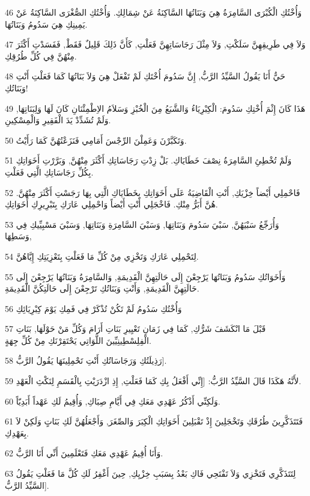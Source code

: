 \par 46 وَأُخْتُكِ الْكُبْرَى السَّامِرَةُ هِيَ وَبَنَاتُهَا السَّاكِنَةُ عَنْ شِمَالِكِ. وَأُخْتُكِ الصُّغْرَى السَّاكِنَةُ عَنْ يَمِينِكِ هِيَ سَدُومُ وَبَنَاتُهَا.
\par 47 وَلاَ فِي طَرِيقِهِنَّ سَلَكْتِ, وَلاَ مِثْلَ رَجَاسَاتِهِنَّ فَعَلْتِ, كَأَنَّ ذَلِكَ قَلِيلٌ فَقَطْ, فَفَسَدْتِ أَكْثَرَ مِنْهُنَّ فِي كُلِّ طُرُقِكِ.
\par 48 حَيٌّ أَنَا يَقُولُ السَّيِّدُ الرَّبُّ, إِنَّ سَدُومَ أُخْتَكِ لَمْ تَفْعَلْ هِيَ وَلاَ بَنَاتُهَا كَمَا فَعَلْتِ أَنْتِ وَبَنَاتُكِ!
\par 49 هَذَا كَانَ إِثْمَ أُخْتِكِ سَدُومَ: الْكِبْرِيَاءُ وَالشَّبَعُ مِنَ الْخُبْزِ وَسَلاَمُ الاِطْمِئْنَانِ كَانَ لَهَا وَلِبَنَاتِهَا, وَلَمْ تُشَدِّدْ يَدَ الْفَقِيرِ وَالْمِسْكِينِ.
\par 50 وَتَكَبَّرْنَ وَعَمِلْنَ الرِّجْسَ أَمَامِي فَنَزَعْتُهُنَّ كَمَا رَأَيْتُ.
\par 51 وَلَمْ تُخْطِئِ السَّامِرَةُ نِصْفَ خَطَايَاكِ. بَلْ زِدْتِ رَجَاسَاتِكِ أَكْثَرَ مِنْهُنَّ, وَبَرَّرْتِ أَخَوَاتِكِ بِكُلِّ رَجَاسَاتِكِ الَّتِي فَعَلْتِ.
\par 52 فَاحْمِلِي أَيْضاً خِزْيَكِ, أَنْتِ الْقَاضِيَةُ عَلَى أَخَوَاتِكِ بِخَطَايَاكِ الَّتِي بِهَا رَجَسْتِ أَكْثَرَ مِنْهُنَّ. هُنَّ أَبَرُّ مِنْكِ. فَاخْجَلِي أَنْتِ أَيْضاً وَاحْمِلِي عَارَكِ بِتَبْرِيرِكِ أَخَوَاتِكِ.
\par 53 وَأُرَجِّعُ سَبْيَهُنَّ, سَبْيَ سَدُومَ وَبَنَاتِهَا, وَسَبْيَ السَّامِرَةِ وَبَنَاتِهَا, وَسَبْيَ مَسْبِيِّيكِ فِي وَسَطِهَا,
\par 54 لِتَحْمِلِي عَارَكِ وَتَخْزِي مِنْ كُلِّ مَا فَعَلْتِ بِتَعْزِيَتِكِ إِيَّاهُنَّ.
\par 55 وَأَخَوَاتُكِ سَدُومُ وَبَنَاتُهَا يَرْجِعْنَ إِلَى حَالَتِهِنَّ الْقَدِيمَةِ, وَالسَّامِرَةُ وَبَنَاتُهَا يَرْجِعْنَ إِلَى حَالَتِهِنَّ الْقَدِيمَةِ, وَأَنْتِ وَبَنَاتُكِ تَرْجِعْنَ إِلَى حَالَتِكُنَّ الْقَدِيمَةِ.
\par 56 وَأُخْتُكِ سَدُومُ لَمْ تَكُنْ تُذْكَرْ فِي فَمِكِ يَوْمَ كِبْرِيَائِكِ
\par 57 قَبْلَ مَا انْكَشَفَ شَرُّكِ, كَمَا فِي زَمَانِ تَعْيِيرِ بَنَاتِ أَرَامَ وَكُلِّ مَنْ حَوْلَهَا, بَنَاتِ الْفِلِسْطِينِيِّينَ اللَّوَاتِي يَحْتَقِرْنَكِ مِنْ كُلِّ جِهَةٍ.
\par 58 رَذِيلَتُكِ وَرَجَاسَاتُكِ أَنْتِ تَحْمِلِينَهَا يَقُولُ الرَّبُّ].
\par 59 لأَنَّهُ هَكَذَا قَالَ السَّيِّدُ الرَّبُّ: [إِنِّي أَفْعَلُ بِكِ كَمَا فَعَلْتِ, إِذِ ازْدَرَيْتِ بِالْقَسَمِ لِنَكْثِ الْعَهْدِ.
\par 60 وَلَكِنِّي أَذْكُرُ عَهْدِي مَعَكِ فِي أَيَّامِ صِبَاكِ, وَأُقِيمُ لَكِ عَهْداً أَبَدِيّاً.
\par 61 فَتَتَذَكَّرِينَ طُرُقَكِ وَتَخْجَلِينَ إِذْ تَقْبَلِينَ أَخَوَاتِكِ الْكِبَرَ وَالصِّغَرَ, وَأَجْعَلُهُنَّ لَكِ بَنَاتٍ وَلَكِنْ لاَ بِعَهْدِكِ.
\par 62 وَأَنَا أُقِيمُ عَهْدِي مَعَكِ فَتَعْلَمِينَ أَنِّي أَنَا الرَّبُّ.
\par 63 لِتَتَذَكَّرِي فَتَخْزِي وَلاَ تَفْتَحِي فَاكِ بَعْدُ بِسَبَبِ خِزْيِكِ, حِينَ أَغْفِرُ لَكِ كُلَّ مَا فَعَلْتِ يَقُولُ السَّيِّدُ الرَّبُّ].

